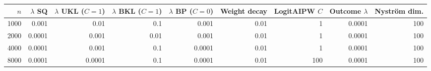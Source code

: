 \begin{tabular}{rrrrrrrrr}
\hline
$n$ & $\lambda$ SQ & $\lambda$ UKL ($C=1$) & $\lambda$ BKL ($C=1$) & $\lambda$ BP ($C=0$) & Weight decay & LogitAIPW $C$ & Outcome $\lambda$ & Nystr\"om dim. \\
\hline
1000 & 0.001 & 0.01 & 0.1 & 0.001 & 0.01 & 1 & 0.0001 & 100 \\
2000 & 0.0001 & 0.001 & 0.01 & 0.001 & 0.01 & 1 & 0.0001 & 100 \\
4000 & 0.0001 & 0.001 & 0.1 & 0.0001 & 0.01 & 1 & 0.0001 & 100 \\
8000 & 0.0001 & 0.0001 & 0.1 & 0.0001 & 0.01 & 100 & 0.0001 & 100 \\
\hline
\end{tabular}
